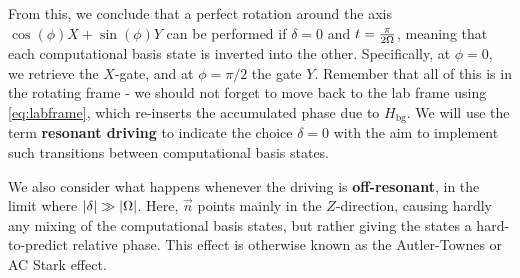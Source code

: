 From this, we conclude that a perfect rotation  around the axis $\cos(\phi) X + \sin(\phi) Y$ can be performed if $\delta=0$ and $t =\frac{\pi}{2\Omega}$, meaning that each computational basis state is inverted into the other. Specifically, at $\phi=0$, we retrieve the $X$-gate, and at $\phi = \pi/2$ the gate $Y$. Remember that all of this is in the rotating frame -  we should not forget to move back to the lab frame using \cref{eq:labframe}, which re-inserts the accumulated phase due to $H_\text{bg}$. We will use the term \textbf{resonant driving} to indicate the choice $\delta=0$ with the aim to implement such transitions between computational basis states.  



We also consider what happens whenever the driving is \textbf{off-resonant}, in the limit where $|\delta| \gg |\Omega|$. Here, $\vec{n}$ points mainly in the $Z$-direction, causing hardly any mixing of the computational basis states, but rather giving the states a hard-to-predict relative phase. This effect is otherwise known as the Autler-Townes or AC Stark effect. %

